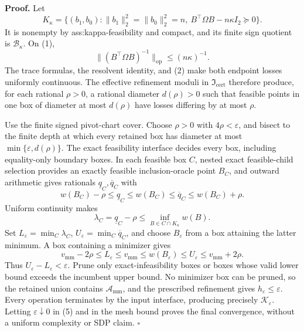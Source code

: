 \textbf{Proof.}
Let
\[
K_\kappa=\{(b_1,b_0):\lVert b_1\rVert_2^2=\lVert b_0\rVert_2^2=n,
\ B^{\top}\Omega B-n\kappa I_2\succeq0\}.
\tag{1}
\]
It is nonempty by ass:kappa-feasibility and compact, and its finite sign quotient is \(\mathcal B_\kappa\).  On (1),
\[
\lVert(B^{\top}\Omega B)^{-1}\rVert_{\mathrm{op}}\le(n\kappa)^{-1}.
\tag{2}
\]
The trace formulas, the resolvent identity, and (2) make both endpoint losses uniformly continuous.  The effective refinement moduli in \(\mathfrak I_{\mathrm{cert}}\) therefore produce, for each rational \(\rho>0\), a rational diameter \(d(\rho)>0\) such that feasible points in one box of diameter at most \(d(\rho)\) have losses differing by at most \(\rho\).

Use the finite signed pivot-chart cover.  Choose \(\rho>0\) with \(4\rho<\varepsilon\), and bisect to the finite depth at which every retained box has diameter at most \(\min\{\varepsilon,d(\rho)\}\).  The exact feasibility interface decides every box, including equality-only boundary boxes.  In each feasible box \(C\), nested exact feasible-child selection provides an exactly feasible inclusion-oracle point \(B_C\), and outward arithmetic gives rationals \(\underline q_C,\overline q_C\) with
\[
w(B_C)-\rho\le\underline q_C\le w(B_C)
\le\overline q_C\le w(B_C)+\rho.
\tag{3}
\]
Uniform continuity makes
\[
\lambda_C=\underline q_C-\rho
\le\inf_{B\in C\cap K_\kappa}w(B).
\tag{4}
\]
Set \(L_\varepsilon=\min_C\lambda_C\), \(U_\varepsilon=\min_C\overline q_C\), and choose \(B_\varepsilon\) from a box attaining the latter minimum.  A box containing a minimizer gives
\[
v_{\mathrm{mm}}-2\rho\le L_\varepsilon\le v_{\mathrm{mm}}
\le w(B_\varepsilon)\le U_\varepsilon\le v_{\mathrm{mm}}+2\rho.
\tag{5}
\]
Thus \(U_\varepsilon-L_\varepsilon<\varepsilon\).  Prune only exact-infeasibility boxes or boxes whose valid lower bound exceeds the incumbent upper bound.  No minimizer box can be pruned, so the retained union contains \(\mathcal A_{\mathrm{mm}}\), and the prescribed refinement gives \(h_\varepsilon\le\varepsilon\).  Every operation terminates by the input interface, producing precisely \(\mathscr K_\varepsilon\).  Letting \(\varepsilon\downarrow0\) in (5) and in the mesh bound proves the final convergence, without a uniform complexity or SDP claim. \(\square\)